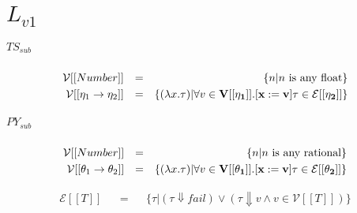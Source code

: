 \documentclass{article}
\begin{document}
	\section{$L_{v1}$}
	
	\subparagraph{$TS_{sub}$}
	\begin{align*}
		\mathcal{V}[[Number]]				&& = && \{ n| n \text{ is any float}\}\\
		\mathcal{V}[[\eta_1 \rightarrow \eta_2]]	&& = && \{ 
				(\lambda x.\tau)| 
				\forall v \in \bf{V}[[\eta_1]].[x:=v]\tau \in \mathcal{E}[[\eta_2]]
		\}
	\end{align*}
	
	\subparagraph{$PY_{sub}$}
	\begin{align*}
		\mathcal{V}[[Number]]				&& = && \{ n| n \text{ is any rational}\}\\
		\mathcal{V}[[\theta_1 \rightarrow \theta_2]]	&& = && \{ 
		(\lambda x.\tau)| 
		\forall v \in \bf{V}[[\theta_1]].[x:=v]\tau \in \mathcal{E}[[\theta_2]]
		\}
	\end{align*}
	
	\begin{align*}
		\mathcal{E}[[T]] && = && \{
		\tau | (\tau \Downarrow fail) \lor
		(\tau \Downarrow v \land v \in \mathcal{V}[[T]])
	\}
	\end{align*}
	
	\printbibliography[heading=bibintoc]
\end{document}
